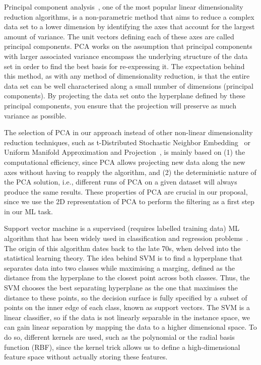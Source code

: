 Principal component analysis~\citep{hotelling:33}, one of the most popular linear dimensionality reduction algorithms, is a non-parametric method that aims to reduce a complex data set to a lower dimension by identifying the axes that account for the largest amount of variance. The unit vectors defining each of these axes are called principal components. PCA works on the assumption that principal components with larger associated variance encompass the underlying structure of the data set in order to find the best basis for re-expressing it. The expectation behind this method, as with any method of dimensionality reduction, is that the entire data set can be well characterised along a small number of dimensions (principal components). By projecting the data set onto the hyperplane defined by these principal components, you ensure that the projection will preserve as much variance as possible.

The selection of PCA in our approach instead of other non-linear dimensionality reduction techniques, such as t-Distributed Stochastic Neighbor Embedding~\citep[t-SNE;][]{vandermaaten08} or Uniform Manifold Approximation and Projection~\citep[UMAP;][]{McInnes2018}, is mainly based on (1) the computational efficiency, since PCA allows projecting new data along the new axes without having to reapply the algorithm, and (2) the deterministic nature of the PCA solution, i.e., different runs of PCA on a given dataset will always produce the same results. These properties of PCA are crucial in our proposal, since we use the 2D representation of PCA to perform the filtering as a first step in our ML task.

Support vector machine is a supervised (requires labelled training data) ML algorithm that has been widely used in classification and regression problems~\citep{2013A&A...550A.120S,2017MNRAS.465.4556G}. The origin of this algorithm dates back to the late 70s, when \citet{vapnik} delved into the statistical learning theory. The idea behind SVM is to find a hyperplane that separates data into two classes while maximising a marging, defined as the distance from the hyperplane to the closest point across both classes. Thus, the SVM chooses the best separating hyperplane as the one that maximises the distance to these points, so the decision surface is fully specified by a subset of points on the inner edge of each class, known as support vectors. The SVM is a linear classifier, so if the data is not linearly separable in the instance space, we can gain linear separation by mapping the data to a higher dimensional space. To do so, different kernels are used, such as the polynomial or the radial basis function (RBF), since the kernel trick allows us to define a high-dimensional feature space without actually storing these features.


